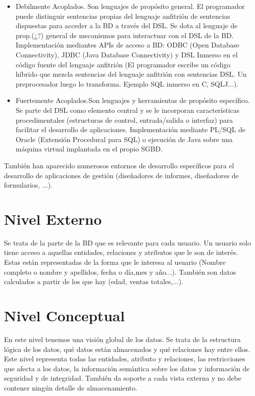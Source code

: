 \documentclass[a4paper,11pt]{article}
\begin{document}
\begin{itemize}
\item Debilmente Acoplados. Son lenguajes de propósito general. El programador puede distinguir sentencias propias del lenguaje anfitrión de sentencias dispuestas para acceder a la BD a través del DSL. Se dota al lenguaje de prop.(¿?) general de mecanismos para interactuar con el DSL de la BD. Implementación mediantes APIs de acceso a BD: ODBC (Open Database Connectivity), JDBC (Java Database Connectivity) y DSL Inmerso en el código fuente del lenguaje anfitrión (El programador escribe un código híbrido que mezcla sentencias del lenguaje anfitrión con sentencias DSL. Un preprocesador luego lo transforma. Ejemplo SQL inmerso en C, SQLJ...).

\item Fuertemente Acoplados.Son lenguajes y herramientas de propósito específico. Se parte del DSL como elemento central y se le incorporan características procedimentales (estructuras de control, entrada/salida o interfaz) para facilitar el desarrollo de aplicaciones. Implementación mediante PL/SQL de Oracle (Extensión Procedural para SQL) o ejecución de Java sobre una máquina virtual implantada en el propio SGBD.
\end{itemize}

También han aparecido numerosos entornos de desarrollo específicos para el desarrollo de aplicaciones de gestión (diseñadores de informes, diseñadores de formularios, ...).

\section{Nivel Externo}
Se trata de la parte de la BD que es relevante para cada usuario. Un usuario solo tiene acceso a aquellas entidades, relaciones y atributos que le son de interés. Estas están representadas de la forma que le interesa al usuario (Nombre completo o nombre y apellidos, fecha o día,mes y año...). También son datos calculados a partir de los que hay (edad, ventas totales,...).

\section{Nivel Conceptual}
En este nivel tenemos una visión global de los datos. Se trata de la estructura lógica de los datos, qué datos están almacenados y qué relaciones hay entre ellos. Este nivel representa todas las entidades, atributo y relaciones, las restricciones que afecta a los datos, la información semántica sobre los datos y información de seguridad y de integridad. También da soporte a cada vista externa y no debe contener ningún detalle de almacenamiento.
\end{document}
